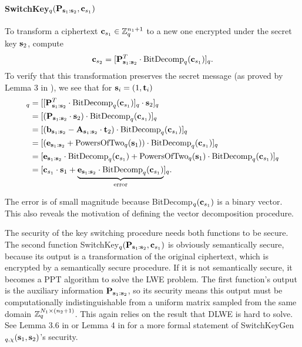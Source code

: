 \documentclass[../main.tex]{subfiles}
\begin{document}
\paragraph{SwitchKey$_q(\mathbf{P}_{\mathbf{s}_1:\mathbf{s}_2},\mathbf{c}_{s_1})$} To transform a ciphertext $\mathbf{c}_{s_1} \in \mathbb{Z}_q^{n_1+1}$ to a new one encrypted under the secret key $\mathbf{s}_2$, compute 
\begin{align*}
    \mathbf{c}_{s_2} = [\mathbf{P}_{\mathbf{s}_1:\mathbf{s}_2}^T \cdot \text{BitDecomp}_q(\mathbf{c}_{s_1})]_q.
\end{align*}
To verify that this transformation preserves the secret message (as proved by Lemma 3 in \citep{brakerski2014leveled}), we see that for $\mathbf{s}_i = (1, \mathbf{t}_i)$
\begin{align*}
    [\vc{c}_{s_2} \cdot \vc{s}_2]_q &=  [[\vc{P}_{\vc{s}_1:\vc{s}_2}^T \cdot \bitdecomp_q(\vc{c}_{s_1})]_q \cdot \vc{s}_2]_q\\
    &= [(\vc{P}_{\vc{s}_1:\vc{s}_2} \cdot \vc{s}_2) \cdot \bitdecomp_q(\vc{c}_{s_1})]_q \\
    &= [(\vc{b}_{\vc{s}_1:\vc{s}_2} - \vc{A}_{\vc{s}_1:\vc{s}_2} \cdot \vc{t}_2) \cdot \bitdecomp_q(\vc{c}_{s_1})]_q \\
    &= [(\vc{e}_{\vc{s}_1:\vc{s}_2} + \text{PowersOfTwo}_q(\vc{s}_1)) \cdot \bitdecomp_q(\vc{c}_{s_1})]_q\\
    &= [\vc{e}_{\vc{s}_1:\vc{s}_2} \cdot \bitdecomp_q(\vc{c}_{s_1}) + \text{PowersOfTwo}_q(\vc{s}_1) \cdot \bitdecomp_q(\vc{c}_{s_1})]_q \\
    &= [\vc{c}_{s_1} \cdot \vc{s}_1 + \underbrace{\vc{e}_{\vc{s}_1:\vc{s}_2} \cdot \bitdecomp_q(\vc{c}_{s_1})}_{\text{error}}]_q.
\end{align*}

The error is of small magnitude because BitDecomp$_q(\mathbf{c}_{s_1})$ is a binary vector. This also reveals the motivation of defining the vector decomposition procedure. 

The security of the key switching procedure needs both functions to be secure. The second function SwitchKey$_q(\mathbf{P}_{\mathbf{s}_1:\mathbf{s}_2},\mathbf{c}_{s_1})$ is obviously semantically secure, because its output is a transformation of the original ciphertext, which is encrypted by a semantically secure procedure. If it is not semantically secure, it becomes a PPT algorithm to solve the LWE problem. The first function's output is the auxiliary information $\mathbf{P}_{\mathbf{s}_1:\mathbf{s}_2}$, so its security means this output must be computationally indistinguishable from a uniform matrix sampled from the same domain $\mathbb{Z}_q^{N_1 \times (n_2+1)}$. This again relies on the result that DLWE is hard to solve. See Lemma 3.6 in \cite{brakerski2012fully} or Lemma 4 in \citep{brakerski2014leveled} for a more formal statement of SwitchKeyGen$_{q,\chi}(\mathbf{s}_1,\mathbf{s}_2)$'s security. 
\end{document}
